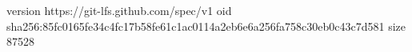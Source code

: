 version https://git-lfs.github.com/spec/v1
oid sha256:85fc0165fe34c4fc17b58fe61c1ac0114a2eb6e6a256fa758c30eb0c43c7d581
size 87528
